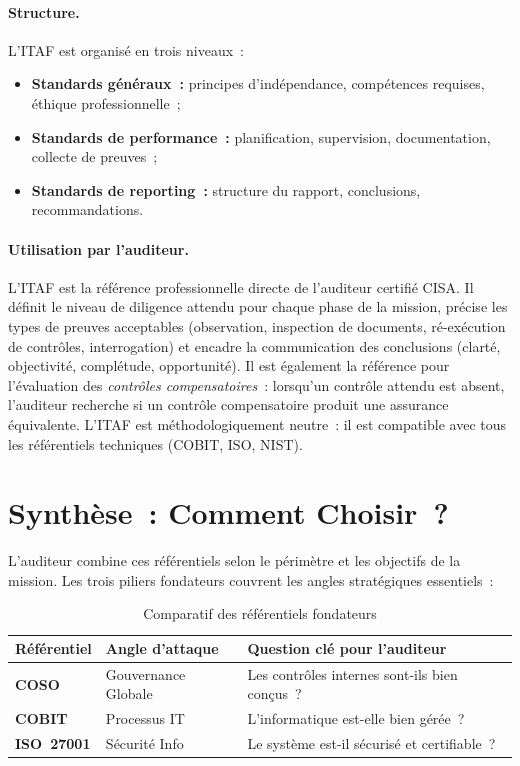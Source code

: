 \paragraph{Structure.} L'ITAF est organisé en trois niveaux~:
\begin{itemize}
    \item \textbf{Standards généraux~:} principes d'indépendance, compétences requises, éthique
        professionnelle~;
    \item \textbf{Standards de performance~:} planification, supervision, documentation,
        collecte de preuves~;
    \item \textbf{Standards de reporting~:} structure du rapport, conclusions,
        recommandations.
\end{itemize}

\paragraph{Utilisation par l'auditeur.} L'ITAF est la référence professionnelle directe de
l'auditeur certifié CISA. Il définit le niveau de diligence attendu pour chaque phase de la
mission, précise les types de preuves acceptables (observation, inspection de documents,
ré-exécution de contrôles, interrogation) et encadre la communication des conclusions (clarté,
objectivité, complétude, opportunité). Il est également la référence pour l'évaluation des
\emph{contrôles compensatoires}~: lorsqu'un contrôle attendu est absent, l'auditeur recherche
si un contrôle compensatoire produit une assurance équivalente. L'ITAF est méthodologiquement
neutre~: il est compatible avec tous les référentiels techniques (COBIT, ISO, NIST).

\section{Synthèse~: Comment Choisir~?}
\label{sec:synthese-referentiels}

L'auditeur combine ces référentiels selon le périmètre et les objectifs de la mission. Les trois
piliers fondateurs couvrent les angles stratégiques essentiels~:

\begin{table}[h!]
\centering
\begin{tabular}{p{3cm}p{4cm}p{5cm}}
    \toprule
    \textbf{Référentiel} & \textbf{Angle d'attaque} & \textbf{Question clé pour l'auditeur} \\
    \midrule
    \textbf{COSO} & Gouvernance Globale & Les contrôles internes sont-ils bien conçus~? \\
    \textbf{COBIT} & Processus IT & L'informatique est-elle bien gérée~? \\
    \textbf{ISO~27001} & Sécurité Info & Le système est-il sécurisé et certifiable~? \\
    \bottomrule
\end{tabular}
\caption{Comparatif des référentiels fondateurs}
\end{table}

